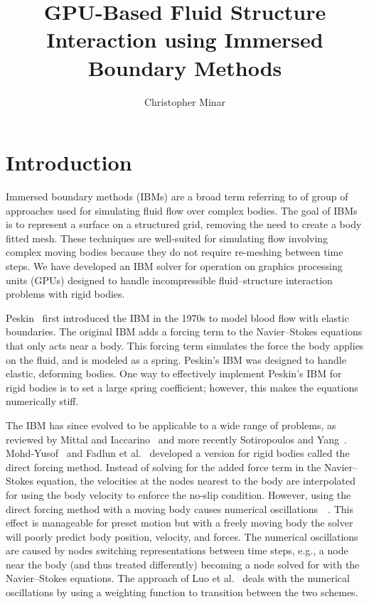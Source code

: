 \documentclass[onehalf,11pt]{beavtex}
\title{GPU-Based Fluid Structure Interaction using Immersed Boundary Methods}
\author{Christopher Minar}
\begin{document}
\maketitle

\mainmatter

\chapter{Introduction}
Immersed boundary methods (IBMs) are a broad term referring to of group of approaches used for simulating fluid flow over complex bodies.
The goal of IBMs is to represent a surface on a structured grid, removing the need to create a body fitted mesh.
These techniques are well-suited for simulating flow involving complex moving bodies because they do not require re-meshing between time steps.
We have developed an IBM solver for operation on graphics processing units (GPUs) designed to handle incompressible fluid--structure interaction problems with rigid bodies.

Peskin~\cite{Peskin:1972gh} first introduced the IBM in the 1970s to model blood flow with elastic boundaries.
The original IBM adds a forcing term to the Navier--Stokes equations that only acts near a body.
This forcing term simulates the force the body applies on the fluid, and is modeled as a spring.
Peskin's IBM was designed to handle elastic, deforming bodies.
One way to effectively implement Peskin's IBM for rigid bodies is to set a large spring coefficient; however, this makes the equations numerically stiff.

The IBM has since evolved to be applicable to a wide range of problems, as reviewed by Mittal and Iaccarino~\cite{Mittal:2005ii} and more recently Sotiropoulos and Yang~\cite{Sotiropoulos:2014gv}.
Mohd-Yusof~\cite{MohdYusof:1997wh} and Fadlun et al.~\cite{Fadlun:2000fl} developed a version for rigid bodies called the direct forcing method.
Instead of solving for the added force term in the Navier--Stokes equation, the velocities at the nodes nearest to the body are interpolated for using the body velocity to enforce the no-slip condition.
However, using the direct forcing method with a moving body causes numerical oscillations~\cite{liao2010simulating}~\cite{Luo:2012gx}.
This effect is manageable for preset motion but with a freely moving body the solver will poorly predict body position, velocity, and forces.
The numerical oscillations are caused by nodes switching representations between time steps, e.g., a node near the body (and thus treated differently) becoming a node solved for with the Navier--Stokes equations.
The approach of Luo et al.~\cite{Luo:2012gx} deals with the numerical oscillations by using a weighting function to transition between the two schemes.
\end{document}
